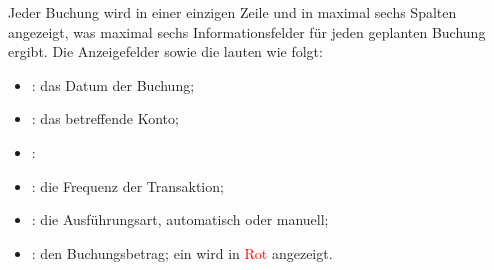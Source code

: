 Jeder Buchung wird in einer einzigen Zeile und in maximal sechs Spalten angezeigt, was maximal sechs Informationsfelder für jeden geplanten Buchung ergibt. Die Anzeigefelder sowie die  lauten wie folgt:
\begin{itemize}
	\item {}: das Datum der Buchung;
	\item {}: das betreffende Konto;
	\item {}: 
	\item {}: die Frequenz der Transaktion;
	\item {}: die Ausführungsart, automatisch oder manuell;
	\item {}: den Buchungsbetrag; ein  wird in \textcolor{red}{Rot} angezeigt.
	

\end{itemize}
